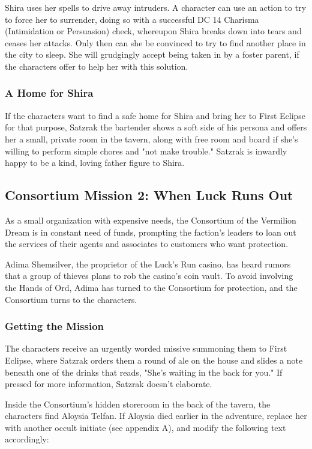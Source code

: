 \documentclass[10pt,a4paper,twoside,bg=print,twocolumn,openany,nodeprecatedcode]{dndbook}
\begin{document}
Shira uses her spells to drive away intruders. A character can use an action to try to force her to surrender, doing so with a successful DC 14 Charisma (Intimidation or Persuasion) check, whereupon Shira breaks down into tears and ceases her attacks. Only then can she be convinced to try to find another place in the city to sleep. She will grudgingly accept being taken in by a foster parent, if the characters offer to help her with this solution.

\subsubsection{A Home for Shira}
If the characters want to find a safe home for Shira and bring her to First Eclipse for that purpose, Satzrak the bartender shows a soft side of his persona and offers her a small, private room in the tavern, along with free room and board if she's willing to perform simple chores and "not make trouble." Satzrak is inwardly happy to be a kind, loving father figure to Shira.



\subsection{Consortium Mission 2: When Luck Runs Out}
As a small organization with expensive needs, the Consortium of the Vermilion Dream is in constant need of funds, prompting the faction's leaders to loan out the services of their agents and associates to customers who want protection.

Adima Shemsilver, the proprietor of the Luck's Run casino, has heard rumors that a group of thieves plans to rob the casino's coin vault. To avoid involving the Hands of Ord, Adima has turned to the Consortium for protection, and the Consortium turns to the characters.



\subsubsection{Getting the Mission}
The characters receive an urgently worded missive summoning them to First Eclipse, where Satzrak orders them a round of ale on the house and slides a note beneath one of the drinks that reads, "She's waiting in the back for you." If pressed for more information, Satzrak doesn't elaborate.

Inside the Consortium's hidden storeroom in the back of the tavern, the characters find Aloysia Telfan. If Aloysia died earlier in the adventure, replace her with another occult initiate (see appendix A), and modify the following text accordingly:
\end{document}
